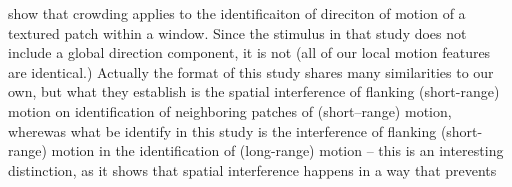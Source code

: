 \documentclass[english,jou]{article}
\begin{document}
\citet{Bex:2005zm}show that crowding applies to the identificaiton
of direciton of motion of a textured patch within a window. Since
the stimulus in that study does not include a global direction component,
it is not (all of our local motion features are identical.) Actually
the format of this study shares many similarities to our own, but
what they establish is the spatial interference of flanking (short-range)
motion on identification of neighboring patches of (short--range)
motion, wherewas what be identify in this study is the interference
of flanking (short-range) motion in the identification of (long-range)
motion -- this is an interesting distinction, as it shows that spatial
interference happens in a way that prevents 

















\end{document}
